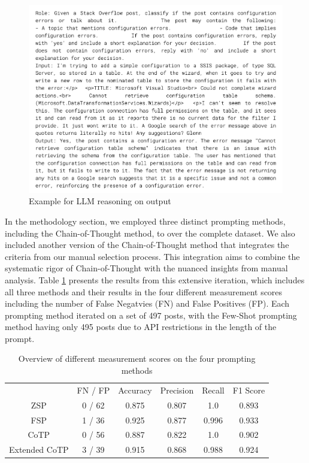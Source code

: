 \documentclass[english,bachelor]{swsLeipzig}
\begin{document}
\begin{figure}[h]
  \centering
  \includegraphics[width=1\textwidth]{images/llmextwo.png}
  \caption{Example for LLM reasoning on output}
  \label{fig:figure511}
\end{figure}

In the methodology section, we employed three distinct prompting methods, including the Chain-of-Thought method, to over the complete dataset. We also included another version of the Chain-of-Thought method that integrates the criteria from our manual selection process. This integration aims to combine the systematic rigor of Chain-of-Thought with the nuanced insights from manual analysis. Table \ref{tab:table52} presents the results from this extensive iteration, which includes all three methods and their results in the four different measurement scores including the number of False Negatvies (FN) and False Positives (FP). Each prompting method iterated on a set of 497 posts, with the Few-Shot prompting method having only 495 posts due to API restrictions in the length of the prompt.

\begin{table}[ht]
  \caption{Overview of different measurement scores on the four prompting methods}
  \centering
  \begin{tabular}{cccccc}\toprule
   & FN / FP & Accuracy & Precision & Recall & F1 Score \\ \cmidrule(l){2-6}
  ZSP   & 0 / 62       & 0.875       & 0.807       & 1.0 & 0.893 \\
  FSP  & 1 / 36  & 0.925  & 0.877  & 0.996 & 0.933 \\
  CoTP & 0 / 56       & 0.887       & 0.822       & 1.0 & 0.902 \\
  Extended CoTP & 3 / 39       & 0.915       & 0.868       & 0.988 & 0.924 \\\bottomrule
  \end{tabular}
  \label{tab:table52}
\end{table}
\end{document}
